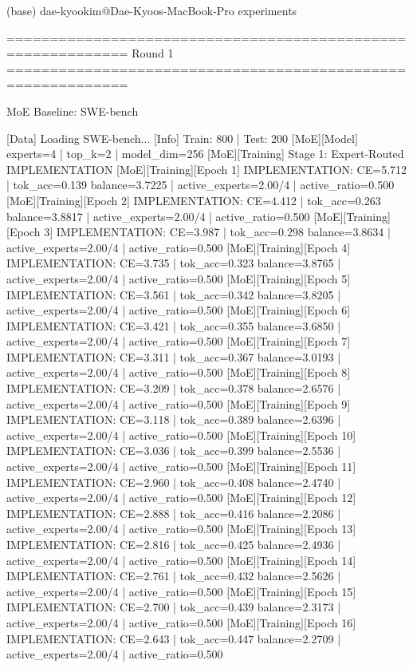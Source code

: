 (base) dae-kyookim@Dae-Kyoos-MacBook-Pro experiments %

============================================================
Round 1
============================================================

MoE Baseline: SWE-bench

[Data] Loading SWE-bench...
[Info] Train: 800 | Test: 200
[MoE][Model] experts=4 | top_k=2 | model_dim=256
[MoE][Training] Stage 1: Expert-Routed IMPLEMENTATION
[MoE][Training][Epoch 1] IMPLEMENTATION: CE=5.712 | tok_acc=0.139
balance=3.7225 | active_experts=2.00/4 | active_ratio=0.500
[MoE][Training][Epoch 2] IMPLEMENTATION: CE=4.412 | tok_acc=0.263
balance=3.8817 | active_experts=2.00/4 | active_ratio=0.500
[MoE][Training][Epoch 3] IMPLEMENTATION: CE=3.987 | tok_acc=0.298
balance=3.8634 | active_experts=2.00/4 | active_ratio=0.500
[MoE][Training][Epoch 4] IMPLEMENTATION: CE=3.735 | tok_acc=0.323
balance=3.8765 | active_experts=2.00/4 | active_ratio=0.500
[MoE][Training][Epoch 5] IMPLEMENTATION: CE=3.561 | tok_acc=0.342
balance=3.8205 | active_experts=2.00/4 | active_ratio=0.500
[MoE][Training][Epoch 6] IMPLEMENTATION: CE=3.421 | tok_acc=0.355
balance=3.6850 | active_experts=2.00/4 | active_ratio=0.500
[MoE][Training][Epoch 7] IMPLEMENTATION: CE=3.311 | tok_acc=0.367
balance=3.0193 | active_experts=2.00/4 | active_ratio=0.500
[MoE][Training][Epoch 8] IMPLEMENTATION: CE=3.209 | tok_acc=0.378
balance=2.6576 | active_experts=2.00/4 | active_ratio=0.500
[MoE][Training][Epoch 9] IMPLEMENTATION: CE=3.118 | tok_acc=0.389
balance=2.6396 | active_experts=2.00/4 | active_ratio=0.500
[MoE][Training][Epoch 10] IMPLEMENTATION: CE=3.036 | tok_acc=0.399
balance=2.5536 | active_experts=2.00/4 | active_ratio=0.500
[MoE][Training][Epoch 11] IMPLEMENTATION: CE=2.960 | tok_acc=0.408
balance=2.4740 | active_experts=2.00/4 | active_ratio=0.500
[MoE][Training][Epoch 12] IMPLEMENTATION: CE=2.888 | tok_acc=0.416
balance=2.2086 | active_experts=2.00/4 | active_ratio=0.500
[MoE][Training][Epoch 13] IMPLEMENTATION: CE=2.816 | tok_acc=0.425
balance=2.4936 | active_experts=2.00/4 | active_ratio=0.500
[MoE][Training][Epoch 14] IMPLEMENTATION: CE=2.761 | tok_acc=0.432
balance=2.5626 | active_experts=2.00/4 | active_ratio=0.500
[MoE][Training][Epoch 15] IMPLEMENTATION: CE=2.700 | tok_acc=0.439
balance=2.3173 | active_experts=2.00/4 | active_ratio=0.500
[MoE][Training][Epoch 16] IMPLEMENTATION: CE=2.643 | tok_acc=0.447
balance=2.2709 | active_experts=2.00/4 | active_ratio=0.500
